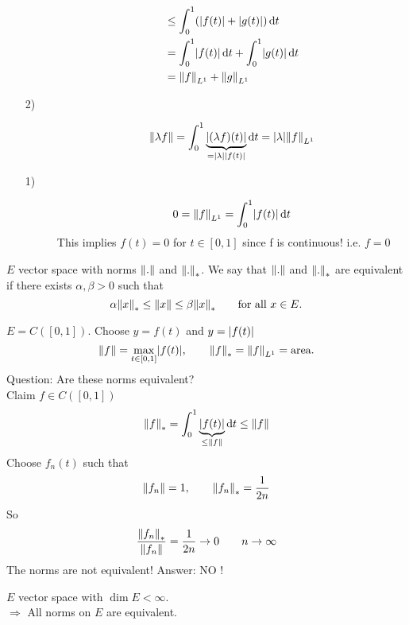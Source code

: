 \begin{beispiele}
\begin{enumerate}[(1)]
\begin{description}
\begin{align*}
			&\leq \int_{0}^{1}(\abs{f(t)}+ \abs{g(t)}) \,\mathrm{d}t \\
			&= \int_{0}^{1}\abs{f(t)} \,\mathrm{d}t + \int_{0}^{1}\abs{g(t)} \,\mathrm{d}t \\
			&= \norm{f}_{L^1} + \norm{g}_{L^1}
		\end{align*}
		\item[2)] \[
			\norm{\lambda f} = \int_{0}^{1} \underset{= \abs{\lambda}\abs{f(t)}}{\underbrace{\abs{(\lambda f)(t)}}} \,\mathrm{d}t = \abs{\lambda} \norm{f}_{L^1}
		\]
		\item[1)] \[
			0 = \norm{f}_{L^1} = \int_{0}^{1}\abs{f(t)} \,\mathrm{d}t
		\]
		This implies $f(t)=0$ for $t \in [0,1]$ since f is continuous! i.e. $f=0$
	\end{description}
	\end{enumerate}
\end{beispiele}
\begin{theorem}
	$E$ vector space with norms $\norm{.}$ and $\norm{.}_{*}$. We say that $\norm{.}$ and $\norm{.}_{*}$ are equivalent if there exists $\alpha, \beta >0$ such that
	\[
		\alpha \norm{x}_{*} \leq \norm{x} \leq \beta \norm{x}_{*} \qquad \text{for all }x \in E.
	\]
\end{theorem}
\begin{beispiel}
		\item $E = C([0,1])$. Choose $y = f(t)$ and $y = \lvert f(t)\rvert$
		\[
			\norm{f} = \max\limits_{t \in [0,1]} \abs{f(t)}, \qquad \norm{f}_{*} = \norm{f}_{L^1} = \text{area}.
		\]
		Question: Are these norms equivalent? \\
		Claim $f \in C([0,1])$ 
		\[
			\norm{f}_{*} = \int_{0}^{1} \underset{\leq \norm{f}}{\underbrace{\abs{f(t)}}} \,\mathrm{d}t \leq \norm{f}
		\]
		Choose $f_n(t)$ such that
		\[
			\norm{f_n} = 1, \qquad \norm{f_n}_{*} = \frac{1}{2n}
		\]
		So 
		\[
			\frac{\norm{f_n}_{*}}{\norm{f_n}} = \frac{1}{2n} \to 0 \qquad n \to \infty
		\]
		The norms are not equivalent! Answer: NO ! 
	\end{beispiel}
\begin{theorem}
	$E$ vector space with $\dim E < \infty$.  \\
	$\Rightarrow $ All norms on $E$ are equivalent.
\end{theorem}
